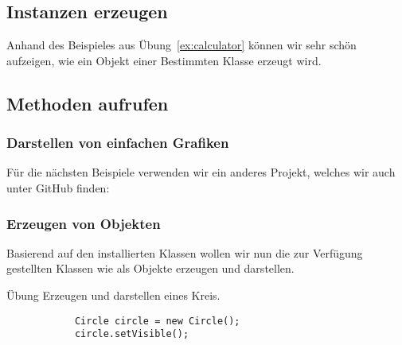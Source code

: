 \subsection{Instanzen erzeugen}
\label{subsec:create-instance}

Anhand des Beispieles aus Übung~\ref{ex:calculator} können wir sehr schön aufzeigen,
wie ein Objekt einer Bestimmten Klasse erzeugt wird.


\mode*
{}


\subsection{Methoden aufrufen}
\label{subsec:call-method}

\begin{frame}[fragile]
    \frametitle<presentation>{Darstellen von einfachen Grafiken}
    Für die nächsten Beispiele verwenden wir ein anderes Projekt, welches wir
    auch unter GitHub finden: 


\end{frame}

\begin{frame}[fragile]
    \frametitle<presentation>{Erzeugen von Objekten}
    Basierend auf den installierten Klassen wollen wir nun die zur Verfügung
    gestellten Klassen wie als Objekte erzeugen und
    darstellen.

    \begin{block}{Übung}
        Erzeugen und darstellen eines Kreis.
        \begin{verbatim}
            Circle circle = new Circle();
            circle.setVisible();
        \end{verbatim}
    \end{block}
\end{frame}

